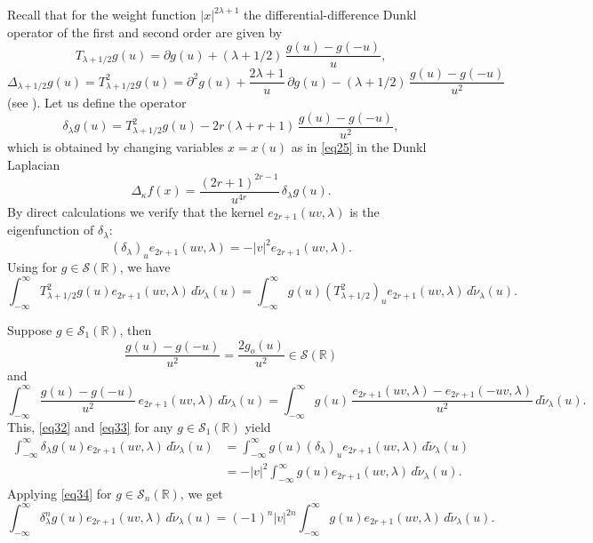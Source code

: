 \documentclass[12pt,twoside,reqno]{amsart}\usepackage[cp1251]{inputenc}
\theoremstyle{plain}
\theoremstyle{remark}
\begin{document}
Recall that for the weight function $|x|^{2\lambda+1}$
the differential-difference
Dunkl operator of the first and second order are given by
\[
T_{\lambda+1/2}g(u)=\partial g(u)+(\lambda+1/2)\,\frac{g(u)-g(-u)}{u},
\]
\[
\Delta_{\lambda+1/2}g(u)=T_{\lambda+1/2}^2g(u)=\partial^{2}
g(u)+\frac{2\lambda+1}{u}\,\partial g(u)-(\lambda+1/2)\,\frac{g(u)-g(-u)}{u^2}
\]
(see \cite{SKO12,Ro02}). Let us define the operator
\[
\delta_{\lambda}g(u)=T_{\lambda+1/2}^2g(u)-2r(\lambda+r+1)\,\frac{g(u)-g(-u)}{u^2},
\]
which  is obtained by changing  variables $x=x(u)$ as in \eqref{eq25} in the Dunkl Laplacian
\[
\Delta_{\kappa}f(x)=\frac{(2r+1)^{2r-1}}{u^{4r}}\,\delta_{\lambda}g(u).
\]
By direct calculations we verify that the kernel $e_{2r+1}(uv,\lambda)$ is the eigenfunction of $\delta_{\lambda}$:
\begin{equation}\label{eq32}
(\delta_{\lambda})_ue_{2r+1}(uv,\lambda)=-|v|^2e_{2r+1}(uv,\lambda).
\end{equation}
Using \cite[Proposition~2.18]{Ro02} for $g\in \mathcal{S}(\mathbb{R})$, we have
\begin{equation}\label{eq33}
\int_{-\infty}^{\infty}T_{\lambda+1/2}^2g(u)e_{2r+1}(uv,\lambda)\,d\widetilde{\nu}_{\lambda}(u)=
\int_{-\infty}^{\infty}g(u)(T_{\lambda+1/2}^2)_ue_{2r+1}(uv,\lambda)\,d\widetilde{\nu}_{\lambda}(u).
\end{equation}

Suppose $g\in \mathcal{S}_1(\mathbb{R})$, then
\[
\frac{g(u)-g(-u)}{u^2}=\frac{2g_{o}(u)}{u^2}\in \mathcal{S}(\mathbb{R})
\]
and
\[
\int_{-\infty}^{\infty}\frac{g(u)-g(-u)}{u^2}\,e_{2r+1}(uv,\lambda)\,d\widetilde{\nu}_{\lambda}(u)=
\int_{-\infty}^{\infty}g(u)\,\frac{e_{2r+1}(uv,\lambda)-e_{2r+1}(-uv,\lambda)}{u^2}\,d\widetilde{\nu}_{\lambda}(u).
\]
This, \eqref{eq32} and \eqref{eq33} for any $g\in \mathcal{S}_1(\mathbb{R})$ yield
\begin{align}\label{eq34}
\int_{-\infty}^{\infty}\delta_{\lambda}g(u)e_{2r+1}(uv,\lambda)\,d\widetilde{\nu}_{\lambda}(u)&=
\int_{-\infty}^{\infty}g(u)(\delta_{\lambda})_ue_{2r+1}(uv,\lambda)\,d\widetilde{\nu}_{\lambda}(u)
\nonumber
\\
&=-|v|^2\int_{-\infty}^{\infty}g(u)e_{2r+1}(uv,\lambda)\,d\widetilde{\nu}_{\lambda}(u).
\end{align}
Applying \eqref{eq34} for $g\in \mathcal{S}_n(\mathbb{R})$, we get
\begin{equation}\label{eq35}
\int_{-\infty}^{\infty}\delta_{\lambda}^ng(u)e_{2r+1}(uv,\lambda)\,d\widetilde{\nu}_{\lambda}(u)=
(-1)^n|v|^{2n}\int_{-\infty}^{\infty}g(u)e_{2r+1}(uv,\lambda)\,d\widetilde{\nu}_{\lambda}(u).
\end{equation}
\end{document}
